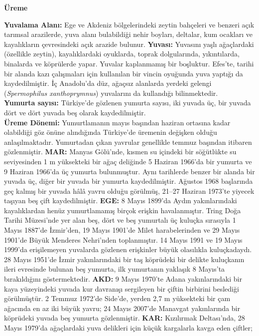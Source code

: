 \documentclass[
  10.5pt,
  a4paper,
  DIV=11,
  numbers=noendperiod,
  twocolumn]{scrreprt}
\begin{document}
\textbf{Üreme}

\textbf{Yuvalama Alanı:} Ege ve Akdeniz bölgelerindeki zeytin bahçeleri
ve benzeri açık tarımsal arazilerde, yuva alanı bulabildiği nehir
boyları, deltalar, kum ocakları ve kayalıkların çevresindeki açık
arazide bulunur.\textbf{\hfill\break
Yuvası:} Yuvasını yaşlı ağaçlardaki (özellikle zeytin), kayalıklardaki
oyuklarda, toprak dolgularında, yıkıntılarda, binalarda ve köprülerde
yapar. Yuvalar kaplanmamış bir boşluktur. Efes'te, tarihi bir alanda
kazı çalışmaları için kullanılan bir vincin oyuğunda yuva yaptığı da
kaydedilmiştir. İç Anadolu'da düz, ağaçsız alanlarda yerdeki gelengi
(\emph{Spermophilus xanthoprymnus}) yuvalarını da kullandığı
bilinmektedir.\\
\textbf{Yumurta sayısı:} Türkiye'de gözlenen yumurta sayısı, iki yuvada
üç, bir yuvada dört ve dört yuvada beş olarak kaydedilmiştir.\\
\textbf{Üreme Dönemi:} Yumurtlamanın mayıs başından haziran ortasına
kadar olabildiği göz önüne alındığında Türkiye'de üremenin değişken
olduğu anlaşılmaktadır. Yumurtadan çıkan yavrular genellikle temmuz
başından itibaren gözlenmiştir. \textbf{MAR:} Manyas Gölü'nde, kısmen su
içindeki bir söğütlükte su seviyesinden 1 m yüksekteki bir ağaç
deliğinde 5 Haziran 1966'da bir yumurta ve 9 Haziran 1966'da üç yumurta
bulunmuştur. Aynı tarihlerde benzer bir alanda bir yuvada üç, diğer bir
yuvada bir yumurta kaydedilmiştir. Ağustos 1968 başlarında geç kalmış
bir yuvada hâlâ yavru olduğu görülmüş, 21--27 Haziran 1973'te yiyecek
taşıyan beş çift kaydedilmiştir. \textbf{EGE:} 8 Mayıs 1899'da Aydın
yakınlarındaki kayalıklardan henüz yumurtlamamış birçok erişkin
havalanmıştır. Tring Doğa Tarihi Müzesi'nde yer alan beş, dört ve beş
yumurtalı üç kuluçka sırasıyla 1 Mayıs 1887'de İzmir'den, 19 Mayıs
1901'de Milet harabelerinden ve 29 Mayıs 1901'de Büyük Menderes
Nehri'nden toplanmıştır. 14 Mayıs 1991 ve 19 Mayıs 1999'da erişilemeyen
yuvalarda gözlenen erişkinler büyük olasılıkla kuluçkadaydı. 28 Mayıs
1951'de İzmir yakınlarındaki bir taş köprüdeki bir delikte kuluçkanın
ileri evresinde bulunan beş yumurta, ilk yumurtanın yaklaşık 8 Mayıs'ta
bırakıldığını göstermektedir. \textbf{AKD:} 9 Mayıs 1970'te Adana
yakınlarındaki bir kaya yüzeyindeki yuvada kur davranışı sergileyen bir
çiftin birbirini beslediği görülmüştür. 2 Temmuz 1972'de Side'de, yerden
2,7 m yüksekteki bir çam ağacında en az iki büyük yavru; 24 Mayıs
2007'de Manavgat yakınlarında bir köprüdeki yuvada beş yumurta
gözlenmiştir. \textbf{KAR:} Kızılırmak Deltası'nda, 28 Mayıs 1979'da
ağaçlardaki yuva delikleri için küçük kargalarla kavga eden çiftler;
\end{document}
